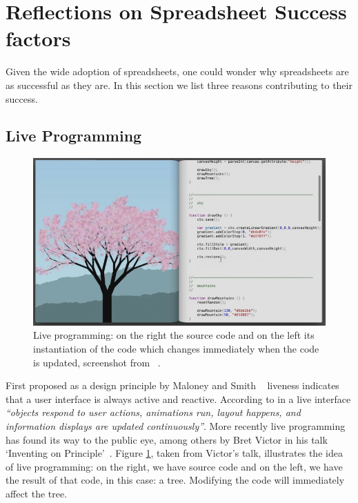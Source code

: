 \documentclass[conference]{IEEEtran}
\begin{document}
\section{Reflections on Spreadsheet Success factors}
Given the wide adoption of spreadsheets, one could wonder why spreadsheets are as successful as they are. In this section we list three reasons contributing to their success.

\subsection{Live Programming}

\begin{figure}
  \begin{center}
  \includegraphics[width=\columnwidth]{fig/bret.png}
  \caption{Live programming: on the right the source code and on the left its instantiation of the code which changes immediately when the code is updated, screenshot from ~\cite{Victor2012}.}
  \label{fig:bret}
  \end{center}
\end{figure} 

First proposed as a design principle by Maloney and Smith ~\cite{maloney_directness_1995} liveness indicates that a user interface is always active and reactive. According to \cite{maloney_directness_1995} in a live interface \emph{``objects respond to user actions, animations run, layout happens, and information displays are updated continuously''}. More recently  live programming has found its way to the public eye, among others by Bret Victor in his talk `Inventing on Principle'~\cite{Victor2012}. Figure \ref{fig:bret}, taken from Victor's talk, illustrates the idea of live programming: on the right, we have source code and on the left, we have the result of that code, in this case: a tree. Modifying the code will immediately affect the tree.
 
\end{document}
